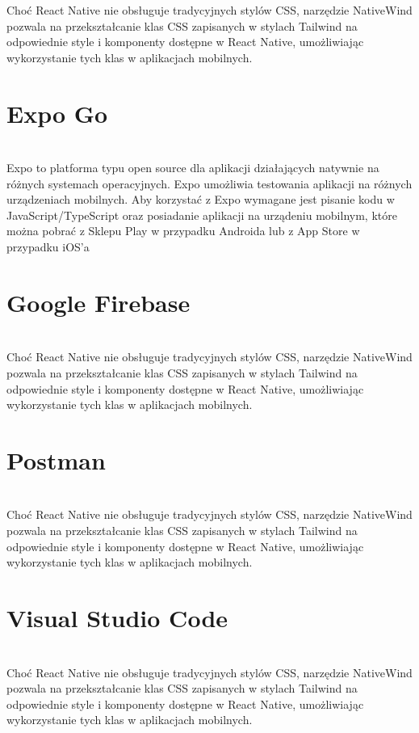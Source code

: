 Choć React Native nie obsługuje tradycyjnych stylów CSS, narzędzie NativeWind pozwala na przekształcanie klas CSS zapisanych w stylach Tailwind na odpowiednie style i komponenty dostępne w React Native, umożliwiając wykorzystanie tych klas w aplikacjach mobilnych.\\

\section{Expo Go}\\
\cite{expogo} Expo to platforma typu open source dla aplikacji działających natywnie na różnych systemach operacyjnych. Expo umożliwia testowania aplikacji na różnych urządzeniach mobilnych. Aby korzystać z Expo wymagane jest pisanie kodu w JavaScript/TypeScript oraz posiadanie aplikacji na urządeniu mobilnym, które można pobrać z Sklepu Play w przypadku Androida lub z App Store w przypadku iOS'a\\


\section{Google Firebase}\\
Choć React Native nie obsługuje tradycyjnych stylów CSS, narzędzie NativeWind pozwala na przekształcanie klas CSS zapisanych w stylach Tailwind na odpowiednie style i komponenty dostępne w React Native, umożliwiając wykorzystanie tych klas w aplikacjach mobilnych.\\


\section{Postman}\\
Choć React Native nie obsługuje tradycyjnych stylów CSS, narzędzie NativeWind pozwala na przekształcanie klas CSS zapisanych w stylach Tailwind na odpowiednie style i komponenty dostępne w React Native, umożliwiając wykorzystanie tych klas w aplikacjach mobilnych.\\


\section{Visual Studio Code}\\
Choć React Native nie obsługuje tradycyjnych stylów CSS, narzędzie NativeWind pozwala na przekształcanie klas CSS zapisanych w stylach Tailwind na odpowiednie style i komponenty dostępne w React Native, umożliwiając wykorzystanie tych klas w aplikacjach mobilnych.\\


